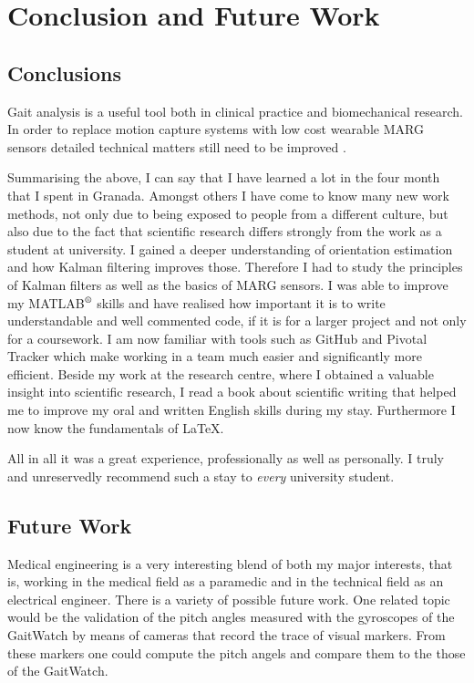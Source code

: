 \chapter{Conclusion and Future Work}
\label{ch:Conclusion and Future Work}

\section{Conclusions}

Gait analysis is a useful tool both in clinical practice and biomechanical research. In order to replace motion capture systems with low cost wearable \gls{MARG} sensors detailed technical matters still need to be improved \cite{tao_gait_2012}.

Summarising the above, I can say that I have learned a lot in the four month that I spent in Granada. Amongst others I have come to know many new work methods, not only due to being exposed to people from a different culture, but also due to the fact that scientific research differs strongly from the work as a student at university. I gained a deeper understanding of orientation estimation and how Kalman filtering improves those. Therefore I had to study the principles of Kalman filters as well as the basics of MARG sensors. I was able to improve my MATLAB$\textsuperscript{\textregistered}$ skills and have realised how important it is to write understandable and well commented code, if it is for a larger project and not only for a coursework. I am now familiar with tools such as GitHub and Pivotal Tracker which make working in a team much easier and significantly more efficient.  Beside my work at the research centre, where I obtained a valuable insight into scientific research, I read a book about scientific writing that helped me to improve my oral and written English skills during my stay. Furthermore I now know the fundamentals of \LaTeX{}.

All in all it was a great experience, professionally as well as personally. I truly and unreservedly recommend such a stay to \emph{every} university student.

\section{Future Work}

Medical engineering is a very interesting blend of both my major interests, that is, working in the medical field as a paramedic and  in the technical field as an electrical engineer. There is a variety of possible future work. One related topic would be the validation of the pitch angles measured with the gyroscopes of the GaitWatch by means of cameras that record the trace of visual markers. From these markers one could compute the pitch angels and compare them to the those of the GaitWatch.

